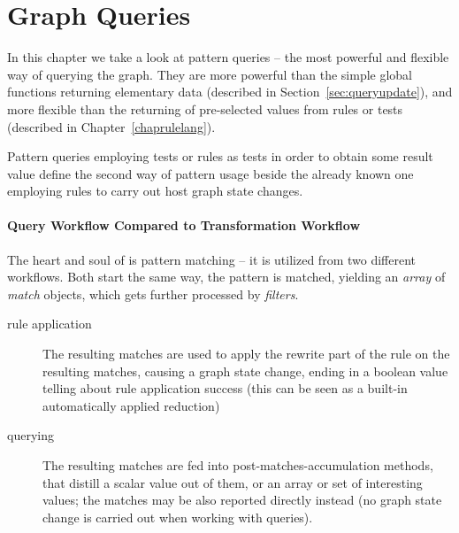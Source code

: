 \chapter{Graph Queries}\label{cha:graphquery}

In this chapter we take a look at pattern queries -- the most powerful and flexible way of querying the graph.
They are more powerful than the simple global functions returning elementary data (described in Section~\ref{sec:queryupdate}),
and more flexible than the returning of pre-selected values from rules or tests (described in Chapter~\ref{chaprulelang}).

Pattern queries employing tests or rules as tests in order to obtain some result value define the second way of pattern usage beside the already known one employing rules to carry out host graph state changes.

\subsubsection*{Query Workflow Compared to Transformation Workflow}


The heart and soul of \GrG{} is pattern matching -- it is utilized from two different workflows.
Both start the same way, the pattern is matched, yielding an \emph{array} of \emph{match} objects, which gets further processed by \emph{filters}.
\begin{description}
	\item[rule application] The resulting matches are used to apply the rewrite part of the rule on the resulting matches, causing a graph state change, ending in a boolean value telling about rule application success (this can be seen as a built-in automatically applied reduction) %
	\item[querying] The resulting matches are fed into post-matches-accumulation methods, that distill a scalar value out of them, or an array or set of interesting values; the matches may be also reported directly instead (no graph state change is carried out when working with queries).
\end{description}

